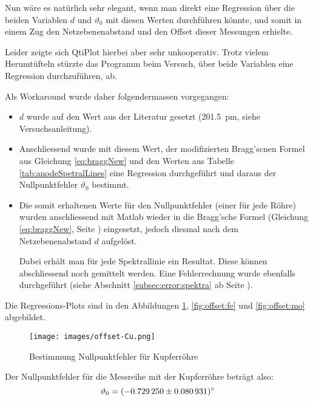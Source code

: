 Nun w\"are es nat\"urlich sehr elegant, wenn man direkt eine Regression \"uber
die  beiden Variablen  $d$ und  $\vartheta_0$ mit  diesen Werten  durchf\"uhren
k\"onnte, und somit  in einem Zug den Netzebenenabstand und  den Offset dieser
Messungen erhielte.

Leider  zeigte  sich  QtiPlot  hierbei aber  sehr  unkooperativ. Trotz  vielem
Herumt\"ufteln  st\"urzte das  Programm beim  Versuch, \"uber  beide Variablen
eine Regression durchzuf\"uhren, ab.

Als Workaround wurde daher folgendermassen vorgegangen:

\begin{itemize}
    \item
        $d$    wurde    auf   den    Wert    aus    der   Literatur    gesetzt
        (\SI{201.5}{\pico\meter}, siehe Versuchsanleitung).
    \item
        Anschliessend  wurde mit  diesem Wert,  der modifizierten  Bragg'scnen
        Formel  aus Gleichung  \ref{eq:braggNew}  und den  Werten aus  Tabelle
        \ref{tab:anodeSpetralLines} eine Regression  durchgef\"uhrt und daraus
        der Nullpunktfehler $\vartheta_0$ bestimmt.
    \item
        Die somit erhaltenen Werte f\"ur den Nullpunktfehler (einer f\"ur jede
        R\"ohre)  wurden anschliessend  mit  Matlab wieder  in die  Bragg'sche
        Formel  (Gleichung   \ref{eq:braggNew},  Seite  \pageref{eq:braggNew})
        eingesetzt, jedoch diesmal nach dem Netzebenenabstand $d$ aufgel\"ost.

        Dabei     erh\"alt     man     f\"ur    jede     Spektrallinie     ein
        Resultat. Diese  k\"onnen  abschliessend noch  gemittelt  werden. Eine
        Fehlerrechnung   wurde  ebenfalls   durchgef\"uhrt  (siehe   Abschnitt
        \ref{subsec:error:spektra} ab Seite \pageref{subsec:error:spektra}).
\end{itemize}

Die   Regressions-Plots   sind   in   den   Abbildungen   \ref{fig:offset:cu},
\ref{fig:offset:fe} und \ref{fig:offset:mo} abgebildet.


\begin{figure}[h!]
    \centering
    \texttt{[image: images/offset-Cu.png]}
    \caption{Bestimmung Nullpunktfehler f\"ur Kupferr\"ohre}
    \label{fig:offset:cu}
\end{figure}
Der Nullpunktfehler f\"ur die Messreihe mit der Kupferr\"ohre betr\"agt also:
$$\vartheta_0 = \SI{-0.72925 \pm 0.080931}{\degree}$$


